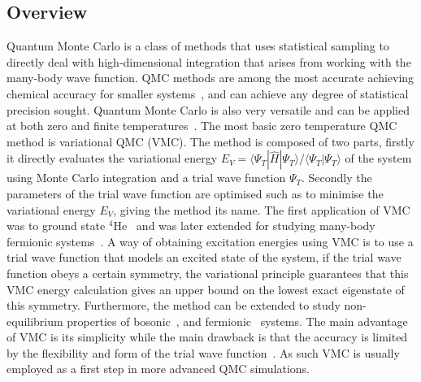 \subsection{Overview}
\label{subsec:qmc-overview}
Quantum Monte Carlo is a class of methods that uses statistical sampling to directly deal with high-dimensional integration that arises from working with the many-body wave function. QMC methods are among the most accurate achieving chemical accuracy for smaller systems~\cite{foulkes2001quantum}, and can achieve any degree of statistical precision sought. Quantum Monte Carlo is also very versatile and can be applied at both zero and finite temperatures~\cite{austin2012quantum}.	
The most basic zero temperature QMC method is variational QMC (VMC). The method is composed of two parts, firstly it directly evaluates the variational energy $E_V = \langle \Psi_{T} | \hat H | \Psi_{T} \rangle / \langle \Psi_{T} | \Psi_{T} \rangle$ of the system using Monte Carlo integration and a trial wave function $\Psi_{T}$. Secondly the parameters of the trial wave function are optimised such as to minimise the variational energy $E_V$, giving the method its name. The first application of VMC was to ground state ${}^4$He~\cite{mcmillan1965ground} and was later extended for studying many-body fermionic systems~\cite{ceperley1977monte}. A way of obtaining excitation energies using VMC is to use a trial wave function that models an excited state of the system, if the trial wave function obeys a certain symmetry, the variational principle guarantees that this VMC energy calculation gives an upper bound on the lowest exact eigenstate of this symmetry. Furthermore, the method can be extended to study non-equilibrium properties of bosonic~\cite{carleo2012localization, carleo2014light}, and fermionic~\cite{ido2015time} systems. The main advantage of VMC is its simplicity while the main drawback is that the accuracy is limited by the flexibility and form of the trial wave function~\cite{austin2012quantum}. As such VMC is usually employed as a first step in more advanced QMC simulations. 

